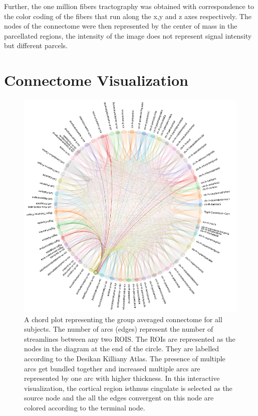 \documentclass[msthesis.tex]{subfiles}
\begin{document}
Further, the one million fibers tractography was obtained with correspondence to the color coding of the fibers that run along the x,y and z axes respectively. The nodes of the connectome were then represented by the center of mass in the parcellated regions, the intensity of the image does not represent signal intensity but different parcels. 


\section{Connectome Visualization}
\label{sec:connectome_generation}
\begin{figure}
    \centering
    \includegraphics[width=\textwidth]{images/bokeh_plot_allsubjects.png}
    \caption{A chord plot representing the group averaged connectome for all subjects. The number of arcs (edges) represent the number of streamlines between any two ROIS. The ROIs are represented as the nodes in the diagram at the end of the circle. They are labelled according to the Desikan Killiany Atlas. The presence of multiple arcs get bundled together and increased multiple arcs are represented by one arc with higher thickness. In this interactive visualization, the cortical region isthmus cingulate is selected as the source node and the all the edges convergent on this node are colored according to the terminal node.}
    \label{fig:connectome_num_streamlines}
\end{figure}
\end{document}
